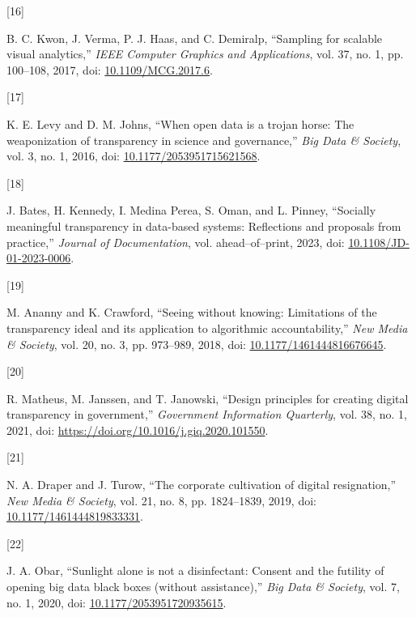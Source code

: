 \documentclass{article}
\newlength{\cslhangindent}
\newlength{\csllabelwidth}
\newlength{\cslentryspacingunit} %
\newenvironment{CSLReferences}[2] %
 {%
  \setlength{\parindent}{0pt}
  \ifodd #1
  \let\oldpar\par
  \def\par{\hangindent=\cslhangindent\oldpar}
  \fi
  \setlength{\parskip}{#2\cslentryspacingunit}
 }%
 {}
\newcommand{\CSLLeftMargin}[1]{\parbox[t]{\csllabelwidth}{#1}}
\newcommand{\CSLRightInline}[1]{\parbox[t]{\linewidth - \csllabelwidth}{#1}\break}
\begin{document}
\begin{CSLReferences}{0}{0}
\leavevmode{}%
\CSLLeftMargin{{[}16{]} }
\CSLRightInline{B. C. Kwon, J. Verma, P. J. Haas, and C. Demiralp,
{``Sampling for scalable visual analytics,''} \emph{IEEE Computer
Graphics and Applications}, vol. 37, no. 1, pp. 100--108, 2017, doi:
\href{https://doi.org/10.1109/MCG.2017.6}{10.1109/MCG.2017.6}.}

\leavevmode{}%
\CSLLeftMargin{{[}17{]} }
\CSLRightInline{K. E. Levy and D. M. Johns, {``When open data is a
trojan horse: The weaponization of transparency in science and
governance,''} \emph{Big Data \& Society}, vol. 3, no. 1, 2016, doi:
\href{https://doi.org/10.1177/2053951715621568}{10.1177/2053951715621568}.}

\leavevmode{}%
\CSLLeftMargin{{[}18{]} }
\CSLRightInline{J. Bates, H. Kennedy, I. Medina Perea, S. Oman, and L.
Pinney, {``Socially meaningful transparency in data-based systems:
Reflections and proposals from practice,''} \emph{Journal of
Documentation}, vol. ahead--of--print, 2023, doi:
\href{https://doi.org/10.1108/JD-01-2023-0006}{10.1108/JD-01-2023-0006}.}

\leavevmode{}%
\CSLLeftMargin{{[}19{]} }
\CSLRightInline{M. Ananny and K. Crawford, {``Seeing without knowing:
Limitations of the transparency ideal and its application to algorithmic
accountability,''} \emph{New Media \& Society}, vol. 20, no. 3, pp.
973--989, 2018, doi:
\href{https://doi.org/10.1177/1461444816676645}{10.1177/1461444816676645}.}

\leavevmode{}%
\CSLLeftMargin{{[}20{]} }
\CSLRightInline{R. Matheus, M. Janssen, and T. Janowski, {``Design
principles for creating digital transparency in government,''}
\emph{Government Information Quarterly}, vol. 38, no. 1, 2021, doi:
\url{https://doi.org/10.1016/j.giq.2020.101550}.}

\leavevmode{}%
\CSLLeftMargin{{[}21{]} }
\CSLRightInline{N. A. Draper and J. Turow, {``The corporate cultivation
of digital resignation,''} \emph{New Media \& Society}, vol. 21, no. 8,
pp. 1824--1839, 2019, doi:
\href{https://doi.org/10.1177/1461444819833331}{10.1177/1461444819833331}.}

\leavevmode{}%
\CSLLeftMargin{{[}22{]} }
\CSLRightInline{J. A. Obar, {``Sunlight alone is not a disinfectant:
Consent and the futility of opening big data black boxes (without
assistance),''} \emph{Big Data \& Society}, vol. 7, no. 1, 2020, doi:
\href{https://doi.org/10.1177/2053951720935615}{10.1177/2053951720935615}.}


\end{CSLReferences}
\end{document}
